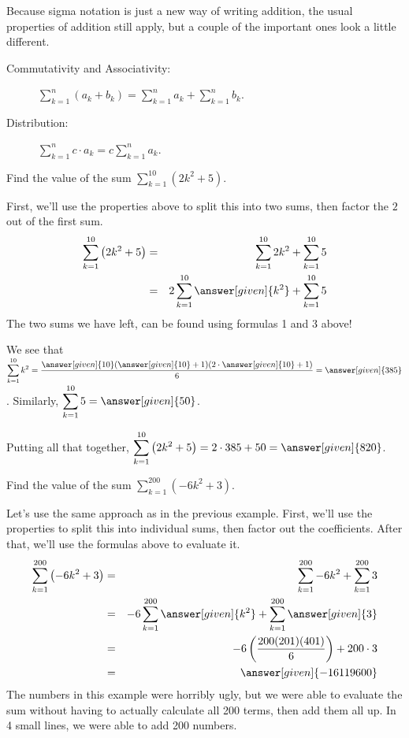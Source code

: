 \documentclass[12pt]{ximera}
\begin{document}
 Because sigma notation is just a new way of writing addition, the usual properties of addition still apply, but a couple of the important ones look a little different.
 \begin{description}
 \item[Commutativity and Associativity:]
   $\displaystyle \sum_{k=1}^{n} (a_k + b_k) = \sum_{k=1}^n a_k + \sum_{k=1}^n b_k$.
 \item[Distribution:]
 	$\displaystyle \sum_{k=1}^{n} c \cdot a_k = c \sum_{k=1}^n a_k$.
 \end{description}
 
\begin{example}
	Find the value of the sum $\displaystyle \sum_{k=1}^{10} \left(2k^2+5\right)$.
	\begin{explanation}
		First, we'll use the properties above to split this into two sums, then factor the $2$ out of the first sum.
		\begin{eqnarray*}
			\sum_{k=1}^{10} \left(2k^2+5\right) &=& \sum_{k=1}^{10} 2k^2 + \sum_{k=1}^{10} 5\\
				&=& 2 \sum_{k=1}^{10} \answer[given]{k^2} + \sum_{k=1}^{10} 5
		\end{eqnarray*}
		The two sums we have left, can be found using formulas 1 and 3 above!
		
		 We see that $\displaystyle \sum_{k=1}^{10} k^2 = \frac{\answer[given]{10}(\answer[given]{10}+1)(2\cdot \answer[given]{10}+1)}{6} = \answer[given]{385}$.  Similarly, $\displaystyle \sum_{k=1}^{10} 5 = \answer[given]{50}$.
		
		 Putting all that together, $\displaystyle \sum_{k=1}^{10}\left(2k^2+5\right) = 2 \cdot 385 + 50 = \answer[given]{820}$.
	\end{explanation}
\end{example}


\begin{example}
	Find the value of the sum $\displaystyle \sum_{k=1}^{200} \left(-6k^2+3\right)$.
	\begin{explanation}
		Let's use the same approach as in the previous example.  First, we'll use the properties to split this into individual sums, then factor out the coefficients.  
		After that, we'll use the formulas above to evaluate it.
		\begin{eqnarray*}
			\sum_{k=1}^{200} \left(-6k^2+3\right) &=&   \sum_{k=1}^{200} -6k^2 + \sum_{k=1}^{200}3\\
				&=&  - 6 \sum_{k=1}^{200} \answer[given]{k^2} + \sum_{k=1}^{200}\answer[given]{3}\\
				&=&  - 6 \left( \frac{200(201)(401)}{6}\right) + 200 \cdot 3\\
				&=& \answer[given]{-16119600}
		\end{eqnarray*}
	The numbers in this example were horribly ugly, but we were able to evaluate the sum without having to actually calculate all 200 terms, then add them all up.
	In 4 small lines, we were able to add 200 numbers.
	
	\end{explanation}
\end{example}
\end{document}
